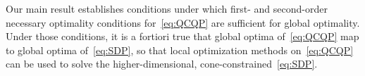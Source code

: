\documentclass{article}
\newcommand{\1}{\mathbf{1}}
\begin{document}

Our main result establishes conditions under which first- and second-order necessary optimality conditions for~\eqref{eq:QCQP} are sufficient for global optimality. Under those conditions, it is a fortiori true that global optima of~\eqref{eq:QCQP} map to global optima of~\eqref{eq:SDP}, so that local optimization methods on~\eqref{eq:QCQP} can be used to solve the higher-dimensional, cone-constrained~\eqref{eq:SDP}.
\end{document}
